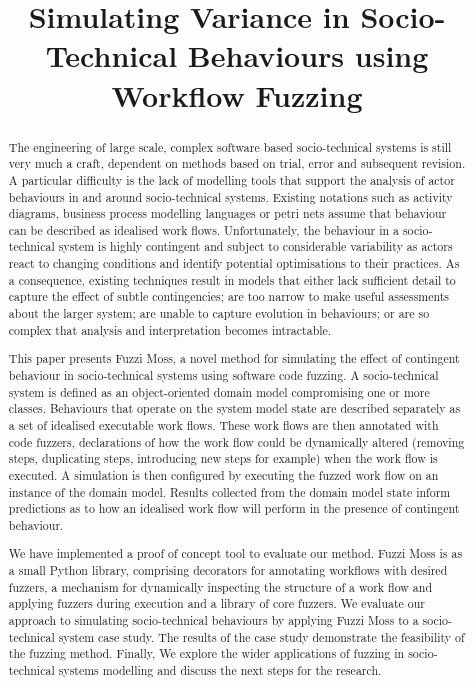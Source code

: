 \documentclass{sig-alternate}
\title{Simulating Variance in Socio-Technical Behaviours using Workflow Fuzzing}
\begin{document}

\maketitle


\begin{abstract}
  The engineering of large scale, complex software based socio-technical systems
  is still very much a craft, dependent on methods based on trial, error and
  subsequent revision.  A particular difficulty is the lack of modelling tools
  that support the analysis of actor behaviours in and around socio-technical
  systems.  Existing notations such as activity diagrams, business process
  modelling languages or petri nets assume that behaviour can be described as
  idealised work flows.  Unfortunately, the behaviour in a socio-technical
  system is highly contingent and subject to considerable variability as actors
  react to changing conditions and identify potential optimisations to their
  practices.  As a consequence, existing techniques result in models that either
  lack sufficient detail to capture the effect of subtle contingencies; are too
  narrow to make useful assessments about the larger system; are unable to
  capture evolution in behaviours; or are so complex that analysis and
  interpretation becomes intractable.

  This paper presents Fuzzi Moss, a novel method for simulating the effect of
  contingent behaviour in socio-technical systems using software code fuzzing.
  A socio-technical system is defined as an object-oriented domain model
  compromising one or more classes.  Behaviours that operate on the system model
  state are described separately as a set of idealised executable work flows.
  These work flows are then annotated with code fuzzers, declarations of how the
  work flow could be dynamically altered (removing steps, duplicating steps,
  introducing new steps for example) when the work flow is executed.  A
  simulation is then configured by executing the fuzzed work flow on an instance
  of the domain model.  Results collected from the domain model state inform
  predictions as to how an idealised work flow will perform in the presence of
  contingent behaviour.
 
  We have implemented a proof of concept tool to evaluate our method. Fuzzi Moss
  is as a small Python library, comprising decorators for annotating workflows
  with desired fuzzers, a mechanism for dynamically inspecting the structure of
  a work flow and applying fuzzers during execution and a library of core
  fuzzers.  We evaluate our approach to simulating socio-technical behaviours by
  applying Fuzzi Moss to a socio-technical system case study.  The results of
  the case study demonstrate the feasibility of the fuzzing method.  Finally, We
  explore the wider applications of fuzzing in socio-technical systems modelling
  and discuss the next steps for the research.
\end{abstract}
\end{document}
